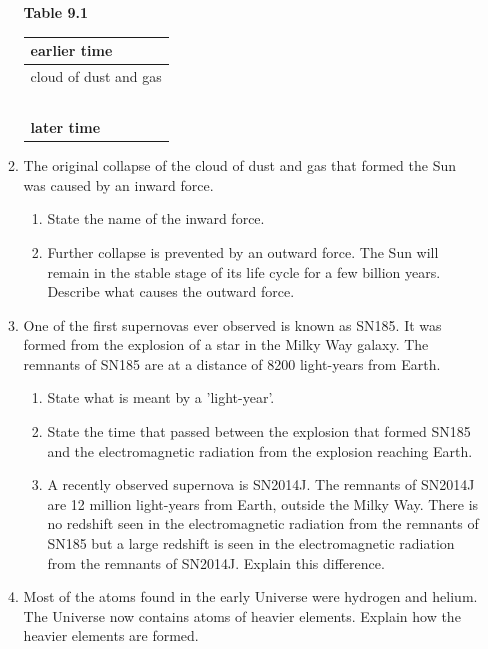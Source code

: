 \documentclass[11pt]{article}
\begin{document}
\begin{enumerate}
\begin{enumerate}[label=(\alph*)]
    \begin{center}
    \textbf{Table 9.1} \\
    \begin{tabular}{|p{5cm}|}
    \hline
    \textbf{earlier time} \\
    \hline
    cloud of dust and gas \\
    \hline
    \rule{0pt}{0.75cm} \\
    \hline
    \rule{0pt}{0.75cm} \\
    \hline
    \rule{0pt}{0.75cm} \\
    \hline
    \rule{0pt}{0.75cm} \\
    \hline
    \rule{0pt}{0.75cm} \\
    \hline
    \textbf{later time} \\
    \hline
    \end{tabular}
    \end{center}

    \item The original collapse of the cloud of dust and gas that formed the Sun was caused by an inward force.
    \begin{enumerate}[label=(\roman*)]
        \item State the name of the inward force.
        
        \item Further collapse is prevented by an outward force. The Sun will remain in the stable stage of its life cycle for a few billion years.
        Describe what causes the outward force.
    \end{enumerate}

    \item One of the first supernovas ever observed is known as SN185. It was formed from the explosion of a star in the Milky Way galaxy.
    The remnants of SN185 are at a distance of 8200 light-years from Earth.
    \begin{enumerate}[label=(\roman*)]
        \item State what is meant by a 'light-year'.
        
        \item State the time that passed between the explosion that formed SN185 and the electromagnetic radiation from the explosion reaching Earth.
        
        \item A recently observed supernova is SN2014J.
        The remnants of SN2014J are 12 million light-years from Earth, outside the Milky Way.
        There is no redshift seen in the electromagnetic radiation from the remnants of SN185 but a large redshift is seen in the electromagnetic radiation from the remnants of SN2014J.
        Explain this difference.
    \end{enumerate}

    \item Most of the atoms found in the early Universe were hydrogen and helium.
    The Universe now contains atoms of heavier elements.
    Explain how the heavier elements are formed.
\end{enumerate}

\end{enumerate}
\end{document}
